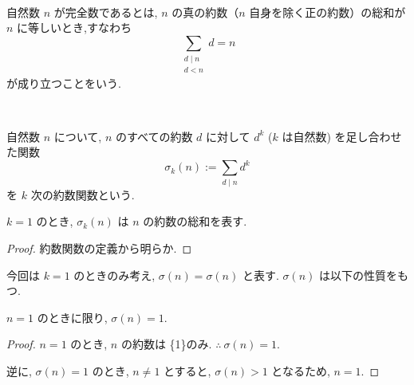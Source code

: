 %

\begin{definition}[完全数]\label{perfect}\leanok~\

自然数 \(n\) が完全数であるとは, \(n\) の真の約数（\(n\) 自身を除く正の約数）の総和が \(n\) に等しいとき,すなわち
\[ \sum_{\substack{d \mid n\\ d < n}} d = n \]
が成り立つことをいう.

\end{definition}


\begin{definition}[約数関数]\label{sigma_div}\leanok~\

自然数 \(n\) について, \(n\) のすべての約数 \(d\) に対して \(d^k\) (\(k\) は自然数) を足し合わせた関数
\[ \sigma_k(n) := \sum_{d \mid n} d^k \]
を \(k\) 次の約数関数という.

\end{definition}


\begin{lemma}\label{sigma_one_apply}\leanok{}
\(k = 1\) のとき, \(\sigma_k(n)\) は \(n\) の約数の総和を表す.
\end{lemma}

\begin{proof}
約数関数の定義から明らか.
\end{proof}


今回は \(k = 1\) のときのみ考え, \(\sigma(n) = \sigma(n)\) と表す.
\(\sigma(n)\) は以下の性質をもつ.


\begin{lemma}\label{one_iff_sum_divisors_eq_one}
\leanok{}
\(n = 1\) のときに限り, \(\sigma(n) = 1\).
\end{lemma}

\begin{proof}
\(n = 1\) のとき, \(n\) の約数は \{1\}のみ. \(\therefore ~\sigma(n) = 1\).

逆に, \(\sigma(n) = 1\) のとき, \(n \neq 1\) とすると, \(\sigma(n) > 1\) となるため, \(n = 1\).
\end{proof}


